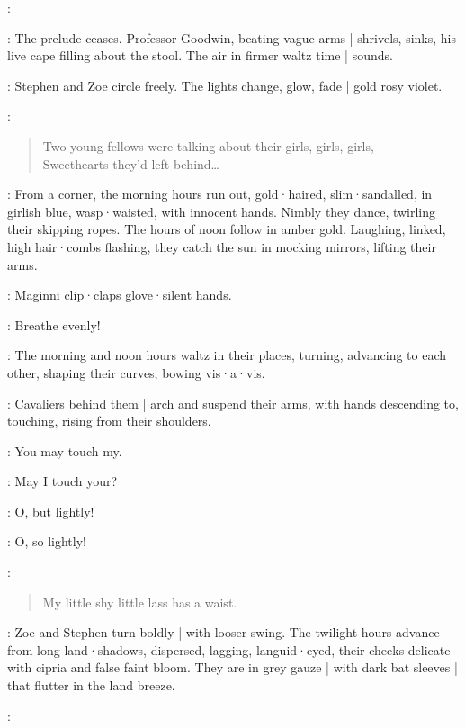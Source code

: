 \Maginni:

:
The prelude ceases.
Professor Goodwin,
beating vague arms |
shrivels,
sinks,
his live cape filling about the stool.
The air in firmer waltz time |
sounds.

:
Stephen and Zoe circle freely.
The lights change,
%
glow,
fade |
gold rosy violet.

\Pianola[6b]:
\begin{verse}
    Two young fellows were talking about their girls, girls, girls,\\
    Sweethearts they'd left behind…
\end{verse}

:
From a corner,
the morning hours run out,
gold·haired,
slim·sandalled,
in girlish blue,
wasp·waisted,
with innocent hands.
Nimbly they dance,
twirling their skipping ropes.
The hours of noon follow in amber gold.
Laughing,
linked,
high hair·combs flashing,
they catch the sun in mocking mirrors,
lifting their arms.

:
Maginni clip·claps glove·silent hands.

\Maginni:
Breathe evenly!

:
The morning and noon hours waltz in their places,
turning,
advancing to each other,
shaping their curves,
bowing vis·a·vis.

:
Cavaliers behind them |
arch and suspend their arms,
with hands descending to,
touching,
rising from their shoulders.

\Hours:
You may touch my.

\Cavaliers:
May I touch your?

\Hours:
O,
but lightly!

\Cavaliers:
O,
so lightly!

\Pianola:
\begin{verse}
    My little shy little lass has a waist.
\end{verse}

:
Zoe and Stephen turn boldly |
with looser swing.
The twilight hours advance from long land·shadows,
dispersed,
lagging,
languid·eyed,
their cheeks delicate with cipria and false faint bloom.
They are in grey gauze |
with dark bat sleeves |
that flutter in the land breeze.

\Maginni:

